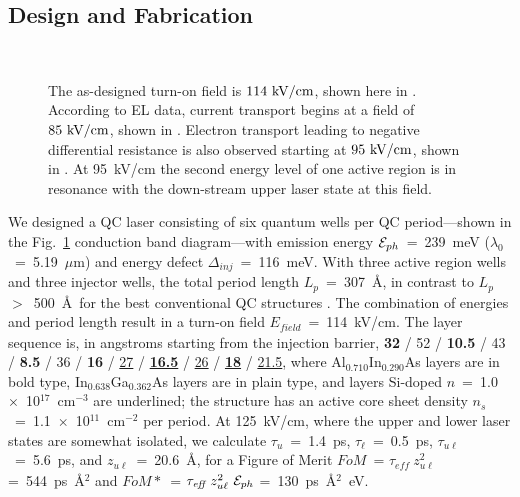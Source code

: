 \subsection{Design and Fabrication}

\begin{figure}[tp]%
\centering%
%
\\%
%
\hfil%
%
\caption[Energy band diagrams for the three injector well QC structure]{  The as-designed turn-on field is $114~\textnormal{kV/cm}$, shown here in .  According to EL data, current transport begins at a field of $85~\textnormal{kV/cm}$, shown in .  Electron transport leading to negative differential resistance is also observed starting at $95~\textnormal{kV/cm}$, shown in .  At 95~kV/cm the second energy level of one active region is in resonance with the down-stream upper laser state at this field.}
\label{3well:band_diagrams}
\end{figure}

We designed a QC laser consisting of six quantum wells per QC period---shown in the Fig.~\ref{3well:band_diagrams} conduction band diagram---with emission energy $\EE_{ph}$~=~239~meV ($\lambda_0$~=~5.19~$\mu$m) and energy defect $\Delta_{inj}$~=~116~meV.  With three active region wells and three injector wells, the total period length $L_p$~=~307~\AA, in contrast to $L_p$~$>$~500~\AA \ for the best conventional QC structures \cite{Lyakh:APL:2008}.  The combination of energies and period length result in a turn-on field $E_\textit{field}$~=~114~kV/cm.  The layer sequence is, in angstroms starting from the injection barrier, \textbf{32} / 52 / \textbf{10.5} / 43 / \textbf{8.5} / 36 / \textbf{16} / \underline{27} / \underline{\textbf{16.5}} / \underline{26} / \underline{\textbf{18}} / \underline{21.5}, where Al$_{0.710}$In$_{0.290}$As layers are in bold type, In$_{0.638}$Ga$_{0.362}$As layers are in plain type, and layers Si-doped $n$~=~1.0~$\times$~10$^{17}$~cm$^{-3}$ are underlined; the structure has an active core sheet density $n_s$~=~1.1~$\times$~10$^{11}$~cm$^{-2}$ per period.  At 125~kV/cm, where the upper and lower laser states are somewhat isolated, we calculate $\tau_u$~=~1.4~ps, $\tau_\ell$~=~0.5~ps, $\tau_{u\ell}$~=~5.6~ps, and $z_{u\ell}$~=~20.6~\AA, for a Figure of Merit $FoM$~= $\tau_\textit{eff} \ z_{u\ell}^2$ =~544~ps~\AA$^2$ and $FoM*$~= $\tau_\textit{eff} \ z_{u\ell}^2 \ \EE_{ph}$ =~130~ps~\AA$^2$~eV.  %


